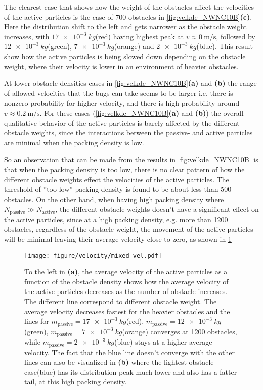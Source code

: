 The clearest case that shows how the weight of the obstacles affect the 
velocities of the active particles is the case of 700 obstacles in 
\cref{fig:velkde_NWNC10B}\textbf{(c)}. Here the distribution shift to the left 
and gets narrower as the obstacle weight increases, 
with $\SI{17e-3}{kg}$(red) having highest peak at 
$v\approx\SI{0}{\metre\per\second}$, followed by $\SI{12e-3}{kg}$(green), 
$\SI{7e-3}{kg}$(orange) and $\SI{2e-3}{kg}$(blue). This result show how 
the active particles is being slowed down depending on the obstacle weight, 
where their velocity is lower in an environment of heavier obstacles. 

At lower obstacle densities cases in \cref{fig:velkde_NWNC10B}\textbf{(a)} and 
\textbf{(b)} the range of allowed velocities 
that the bugs can take seems to be larger i.e. there is nonzero 
probability for higher velocity, and there is high probability 
around $v\approx\SI{0.2}{\metre\per\second}$. For these cases 
(\cref{fig:velkde_NWNC10B}\textbf{(a)} and \textbf{(b)}) the overall 
qualitative behavior of the active particles is barely affected 
by the different obstacle weights, since the interactions between 
the passive- and active particles are minimal when the packing density is low. 

So an observation that can be made from the results in 
\cref{fig:velkde_NWNC10B} is that when the packing density 
is too low, there is no clear pattern of how the different 
obstacle weights effect the velocities of the active particles. 
The threshold of ''too low'' packing density is found to be 
about less than \num{500} obstacles. On the other hand, 
when having high packing density where 
$N_{\text{passive}}\gg N_{\text{active}}$, the different 
obstacle weights doesn't have a significant effect on the 
active particles, since at a high packing density, e.g. 
more than \num{1200} obstacles, regardless of the obstacle weight, 
the movement of the active particles will be minimal leaving their 
average velocity close to zero, as shown in \cref{fig:mean_velocity}

\begin{figure}[htpb]
    \centering
    \texttt{[image: figure/velocity/mixed\_vel.pdf]}
    \caption{To the left in \textbf{(a)}, the average velocity of 
    the active particles as a function of the obstacle density shows 
    how the average velocity of the active particles decreases as the 
    number of obstacle increases. The different line correspond to different 
    obstacle weight. The average velocity decreases fastest for the heavier 
    obstacles and the lines for $m_{\text{passive}}=\SI{17e-3}{kg}$(red), 
    $m_{\text{passive}}=\SI{12e-3}{kg}$(green), $m_{\text{passive}}=\SI{7e-3}{kg}$(orange) 
    converges at \num{1200} obstacles, while $m_{\text{passive}}=\SI{2e-3}{kg}$(blue) 
    stays at a higher average velocity. The fact that the blue line doesn't converge 
    with the other lines can also be visualized in \textbf{(b)} where the lightest obstacle 
    case(blue) has its distribution peak much lower and also has a fatter tail, at this 
    high packing density.}
    \label{fig:mean_velocity}
\end{figure}

